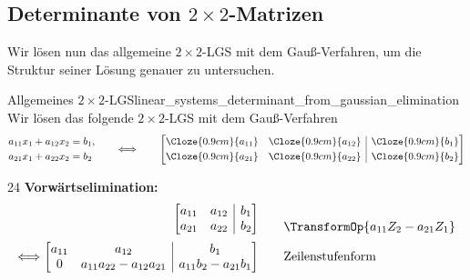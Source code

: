 \subsection{Determinante von $2\times2$-Matrizen}
\label{subsec:linear_systems_two_by_two_determinants}

Wir lösen nun das allgemeine $2\times2$-LGS mit dem Gauß-Verfahren, um die
Struktur seiner Lösung genauer zu untersuchen.

\begin{ExampleBox}{Allgemeines $2\times2$-LGS}{linear_systems_determinant_from_gaussian_elimination}
  Wir lösen das folgende $2\times2$-LGS mit dem Gauß-Verfahren
  \[
    \begin{aligned}
      a_{11}x_1+a_{12}x_2&=b_1,\\
      a_{21}x_1+a_{22}x_2&=b_2
    \end{aligned}
    \qquad\Longleftrightarrow\qquad
    \left[
      \begin{array}{@{}cc|c@{}}
        \Cloze{0.9cm}{a_{11}}&\Cloze{0.9cm}{a_{12}}&\Cloze{0.9cm}{b_1}\\[0.3em]
        \Cloze{0.9cm}{a_{21}}&\Cloze{0.9cm}{a_{22}}&\Cloze{0.9cm}{b_2}
      \end{array}
    \right]
  \]

  \begin{ClozeArea}[34]{24}
    \textbf{Vorwärtselimination:}
    \[
      \begin{array}{r@{\;}r@{\qquad}l}
        &\left[
          \begin{array}{@{}cc|c@{}}
            a_{11}&a_{12}&b_1\\
            a_{21}&a_{22}&b_2
          \end{array}
        \right]
        &\raisebox{-0.65em}{\(\TransformOp{a_{11}Z_2-a_{21}Z_1}\)}\\[1.2em]
        \Longleftrightarrow
        &\left[
          \begin{array}{@{}cc|c@{}}
            a_{11}&a_{12}&b_1\\
            0&a_{11}a_{22}-a_{12}a_{21}&a_{11}b_2-a_{21}b_1
          \end{array}
        \right]
        &\text{Zeilenstufenform}
      \end{array}
    \]
  \end{ClozeArea}
\end{ExampleBox}

